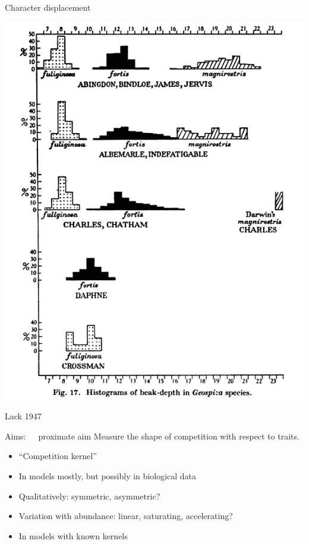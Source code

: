 \documentclass[12pt]{beamer}
\begin{document}
\begin{frame}[t]{Character displacement}
  \begin{center}
    \includegraphics[height=.8\textheight]{pics/finches}

    \small Lack 1947
  \end{center}
\end{frame}

\begin{frame}[t]{Aims:~~~proximate aim}
 Measure the shape of competition with respect to traits.
 \begin{itemize}
 \item ``Competition kernel''
 \item In models mostly, but possibly in biological data
 \item Qualitatively: symmetric, asymmetric?
 \item Variation with abundance: linear, saturating, accelerating?
 \item In models with known kernels
 \end{itemize}
\end{frame}
\end{document}
